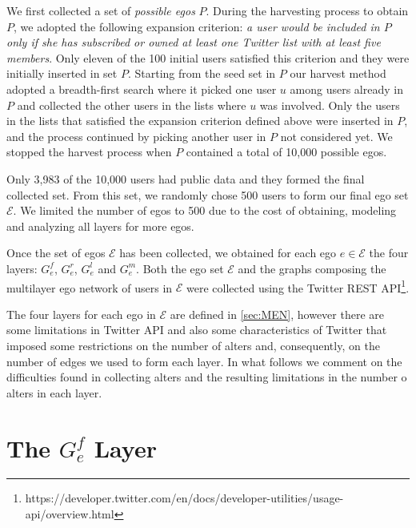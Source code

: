 We first collected a set of {\em possible egos} $P$. During the harvesting process to obtain $P$, we adopted the following expansion criterion: {\em a user would be included in $P$  only if she has subscribed or owned at least one Twitter list with at least five members}. Only eleven of the 100 initial users satisfied this criterion and they were initially inserted in set $P$. 
Starting from the seed set in $P$ our harvest method adopted a breadth-first search where it picked one user $u$ among users already in $P$ and collected the other users in the lists where $u$ was involved. Only the users in the lists that satisfied the expansion criterion defined above were inserted in $P$,  and the process continued by picking another user in $P$ not considered yet. We stopped the harvest process when $P$ contained  a total of 10,000  possible egos.

Only 3,983 of the 10,000 users had public data and they formed the final collected set. From this set, we randomly chose 500 users to form our final ego set $\mathcal{E}$. We limited the number of egos to 500 due to the cost of obtaining, modeling and analyzing all layers for more egos. 

Once the set of egos $\mathcal{E}$ has been collected, we obtained for each ego $e \in \mathcal{E}$ the four layers: $G_e^{f}$, $G_e^{r}$,  $G_e^{l}$ and $G_e^{m}$. Both the ego set $\mathcal{E}$ and the graphs composing the multilayer ego network of users in $\mathcal{E}$ were collected using the Twitter REST API\footnote{https://developer.twitter.com/en/docs/developer-utilities/usage-api/overview.html}. 

The four layers for each ego in $\mathcal{E}$ are defined in \ref{sec:MEN}, however there are some limitations in Twitter API and also some characteristics of Twitter that imposed some restrictions on the number of alters and, consequently, on the number of edges we used to form each layer. In what follows we comment on the difficulties found in collecting alters  and the resulting limitations in the number o alters in each layer.




\section{The \texorpdfstring{$G_e^f$}{Gef} Layer}
\label{sec:dataset_follow_network}


